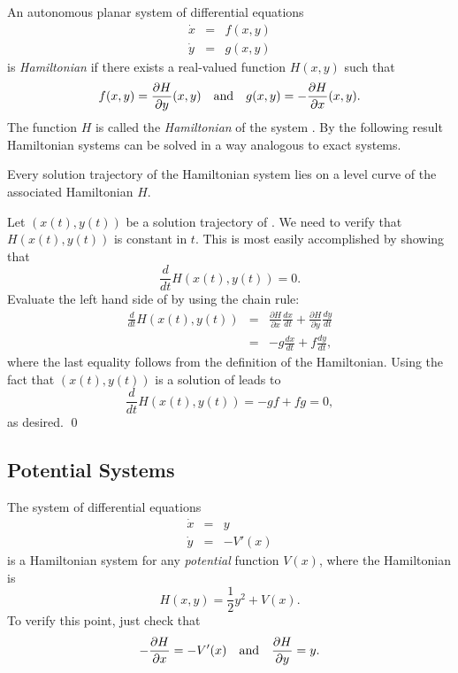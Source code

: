 \documentclass{ximera}
\begin{document}
An autonomous planar system of differential equations 
\begin{equation}  \label{e:ham}
\begin{array}{rcl} 
\dot{x} & = & f(x,y) \\
\dot{y} & = & g(x,y) 
\end{array}
\end{equation}
is {\em Hamiltonian\/} if there exists a real-valued
function $H(x,y)$ such that 
\[
f(x,y) = \frac{\partial H}{\partial y}(x,y) \quad\mbox{and}\quad 
g(x,y) =-\frac{\partial H}{\partial x}(x,y).
\]
The function $H$ is called the {\em Hamiltonian\/}
of the system .
By the following result Hamiltonian systems can be solved in a way analogous 
to exact systems.

\begin{thm}
Every solution trajectory of the Hamiltonian system  lies
on a level curve of the associated Hamiltonian $H$.
\end{thm}

\proof 
Let $(x(t),y(t))$ be a solution trajectory of .  We need to 
verify that $H(x(t),y(t))$ is constant in $t$.  This is most easily 
accomplished by showing that 
\begin{equation} \label{e:dH=0}
\frac{d}{dt} H(x(t),y(t)) = 0.
\end{equation}
Evaluate the left hand side of  by using the chain rule:
\begin{eqnarray*}
\frac{d}{dt} H(x(t),y(t)) & = & \frac{\partial H}{\partial x}\frac{dx}{dt}
+ \frac{\partial H}{\partial y} \frac{dy}{dt} \\
& = & -g\frac{dx}{dt} + f\frac{dy}{dt}, 
\end{eqnarray*}
where the last equality follows from the definition of the Hamiltonian.  
Using the fact that $(x(t),y(t))$ is a solution of  leads to 
\[
 \frac{d}{dt} H(x(t),y(t)) = -gf+fg = 0,
\]
as desired.  \qed

\subsection*{Potential Systems}
The system of differential equations
\begin{equation}  \label{e:hamex}
\begin{array}{rcl} 
\dot{x} & = & y \\
\dot{y} & = & -V'(x) 
\end{array}
\end{equation}
is a Hamiltonian system for any {\em potential\/} function $V(x)$,
where the Hamiltonian is
\[
H(x,y) = \frac{1}{2}y^2 + V(x).
\]
To verify this point, just check that 
\[
-\frac{\partial H}{\partial x} = -V'(x) \quad\mbox{and}\quad \frac{\partial H}{\partial y} = y.
\]
\end{document}
